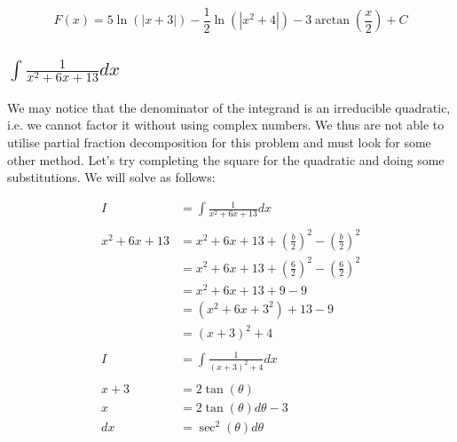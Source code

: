 \documentclass[12pt]{article}
\begin{document}
$$
    F(x) =5\ln(|x+3|) - \frac{1}{2} \ln(|x^2+4|) - 3\arctan\left(\frac{x}{2}\right) + C
$$

\subsection{$\int \frac{1}{x^2+6x+13} dx$}

We may notice that the denominator of the integrand is an irreducible quadratic, i.e. we cannot factor it without using complex numbers. We thus are not able to utilise partial fraction decomposition for this problem and must look for some other method. Let's try completing the square for the quadratic and doing some substitutions. We will solve as follows:


\begin{align}
    I              & = \int \frac{1}{x^2+6x+13} dx                                             \\
    \nonumber                                                                                  \\
    x^2 + 6x + 13  & = x^2 + 6x + 13 + \left(\frac{b}{2}\right)^2 - \left(\frac{b}{2}\right)^2 \\
                   & = x^2 + 6x + 13 + \left(\frac{6}{2}\right)^2 - \left(\frac{6}{2}\right)^2 \\
                   & = x^2 + 6x + 13 + 9 - 9                                                   \\
                   & = (x^2 + 6x + 3^2) + 13 - 9                                               \\
                   & = (x+3)^2 + 4                                                             \\
    \nonumber                                                                                  \\
    I              & = \int \frac{1}{(x+3)^2 + 4} dx                                           \\
    \nonumber                                                                                  \\
    x + 3          & = 2\tan(\theta)                                                           \\
    x              & = 2\tan(\theta) d\theta - 3                                               \\
    dx             & = \sec^2(\theta) d\theta                                                  \\

\end{align}
\end{document}
